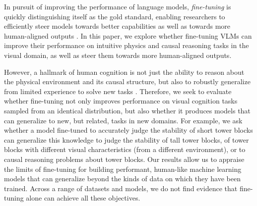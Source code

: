 In pursuit of improving the performance of language models, \textit{fine-tuning} is quickly distinguishing itself as the gold standard, enabling researchers to efficiently steer models towards better capabilities \cite{han2024parameter} as well as towards more human-aligned outputs \cite{binz2024centaur, hussain2024tutorial}. In this paper, we explore whether fine-tuning VLMs can improve their performance on intuitive physics and causal reasoning tasks in the visual domain, as well as steer them towards more human-aligned outputs.

However, a hallmark of human cognition is not just the ability to reason about the physical environment and its causal structure, but also to robustly generalize from limited experience to solve new tasks \cite{collins2022structured,geirhos2018generalisation, griffiths2009theory}. Therefore, we seek to evaluate whether fine-tuning not only improves performance on visual cognition tasks sampled from an identical distribution, but also whether it produces models that can generalize to new, but related, tasks in new domains. For example, we ask whether a model fine-tuned to accurately judge the stability of short tower blocks can generalize this knowledge to judge the stability of tall tower blocks, of tower blocks with different visual characteristics (from a different environment), or to causal reasoning problems about tower blocks. Our results allow us to appraise the limits of fine-tuning for building performant, human-like machine learning models that can generalize beyond the kinds of data on which they have been trained. Across a range of datasets and models, we do not find evidence that fine-tuning alone can achieve all these objectives.

